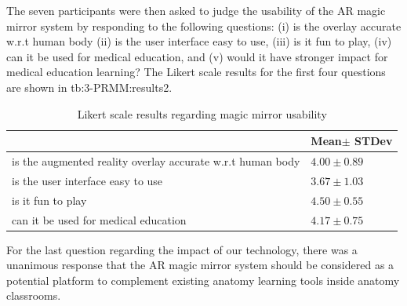 The seven participants were then asked to judge the usability of the AR magic mirror system by responding to the following questions: (i) is the overlay accurate w.r.t human body (ii) is the user interface easy to use, (iii) is it fun to play, (iv) can it be used for medical education, and (v) would it have stronger impact for medical education learning?
The Likert scale results for the first four questions are shown in \tablename{tb:3-PRMM:results2}.
\begin{table}
	\caption{Likert scale results regarding magic mirror usability}
	\label{tb:3-PRMM:results2}
	\scriptsize
	\begin{center}
		\begin{tabular}{p{6cm}|p{3cm}}
			\space & Mean$\pm$ STDev \\
			\hline
			is the augmented reality overlay accurate w.r.t human body & $4.00\pm0.89$\\
			is the user interface easy to use & $3.67\pm1.03$ \\
			is it fun to play & $4.50\pm0.55$\\
			can it be used for medical education & $4.17\pm0.75$
		\end{tabular}
	\end{center}
\end{table}
For the last question regarding the impact of our technology, there was a unanimous response that the AR magic mirror system should be considered as a potential platform to complement existing anatomy learning tools inside anatomy classrooms. 
